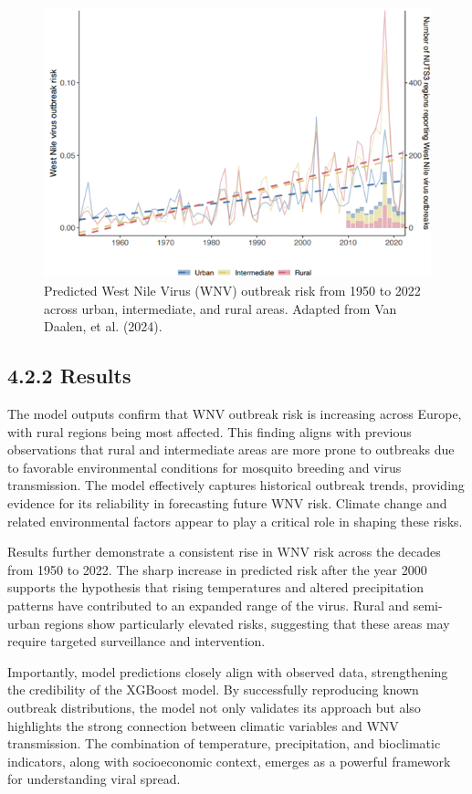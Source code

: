 \documentclass[
]{krantz}
\begin{document}
\begin{figure}
\includegraphics[width=1\linewidth]{3} \caption{Predicted West Nile Virus (WNV) outbreak risk from 1950 to 2022 across urban, intermediate, and rural areas. Adapted from Van Daalen, et al. (2024).}\label{fig:wnvrisktrend}
\end{figure}

\subsection{4.2.2 Results}\label{results-3}

The model outputs confirm that WNV outbreak risk is increasing across Europe, with rural regions being most affected. This finding aligns with previous observations that rural and intermediate areas are more prone to outbreaks due to favorable environmental conditions for mosquito breeding and virus transmission. The model effectively captures historical outbreak trends, providing evidence for its reliability in forecasting future WNV risk. Climate change and related environmental factors appear to play a critical role in shaping these risks.

Results further demonstrate a consistent rise in WNV risk across the decades from 1950 to 2022. The sharp increase in predicted risk after the year 2000 supports the hypothesis that rising temperatures and altered precipitation patterns have contributed to an expanded range of the virus. Rural and semi-urban regions show particularly elevated risks, suggesting that these areas may require targeted surveillance and intervention.

Importantly, model predictions closely align with observed data, strengthening the credibility of the XGBoost model. By successfully reproducing known outbreak distributions, the model not only validates its approach but also highlights the strong connection between climatic variables and WNV transmission. The combination of temperature, precipitation, and bioclimatic indicators, along with socioeconomic context, emerges as a powerful framework for understanding viral spread.
\end{document}
